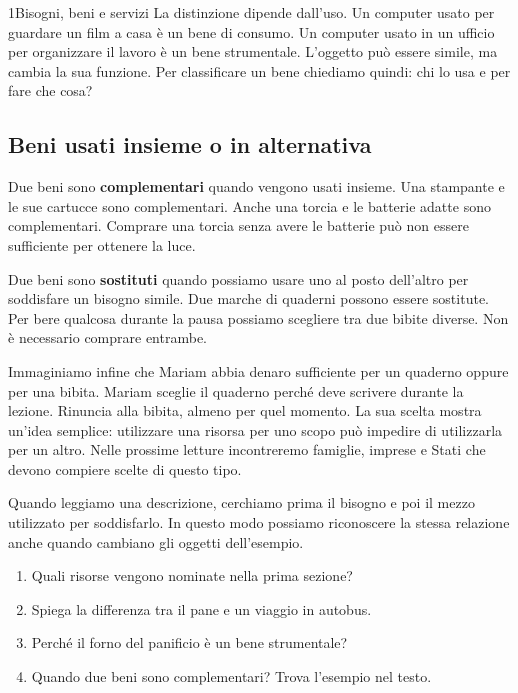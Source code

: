 \begin{lettura}{1}{Bisogni, beni e servizi}
La distinzione dipende dall'uso. Un computer usato per guardare un film a casa è un bene di consumo. Un computer usato in un ufficio per organizzare il lavoro è un bene strumentale. L'oggetto può essere simile, ma cambia la sua funzione. Per classificare un bene chiediamo quindi: chi lo usa e per fare che cosa?

\subsection*{Beni usati insieme o in alternativa}
Due beni sono \textbf{complementari} quando vengono usati insieme. Una stampante e le sue cartucce sono complementari. Anche una torcia e le batterie adatte sono complementari. Comprare una torcia senza avere le batterie può non essere sufficiente per ottenere la luce.

Due beni sono \textbf{sostituti} quando possiamo usare uno al posto dell'altro per soddisfare un bisogno simile. Due marche di quaderni possono essere sostitute. Per bere qualcosa durante la pausa possiamo scegliere tra due bibite diverse. Non è necessario comprare entrambe.

Immaginiamo infine che Mariam abbia denaro sufficiente per un quaderno oppure per una bibita. Mariam sceglie il quaderno perché deve scrivere durante la lezione. Rinuncia alla bibita, almeno per quel momento. La sua scelta mostra un'idea semplice: utilizzare una risorsa per uno scopo può impedire di utilizzarla per un altro. Nelle prossime letture incontreremo famiglie, imprese e Stati che devono compiere scelte di questo tipo.


Quando leggiamo una descrizione, cerchiamo prima il bisogno e poi il mezzo utilizzato per soddisfarlo. In questo modo possiamo riconoscere la stessa relazione anche quando cambiano gli oggetti dell'esempio.


\attivita
\begin{enumerate}

\item Quali risorse vengono nominate nella prima sezione?

\item Spiega la differenza tra il pane e un viaggio in autobus.

\item Perché il forno del panificio è un bene strumentale?

\item Quando due beni sono complementari? Trova l’esempio nel testo.

\end{enumerate}
\lessico


\end{lettura}
